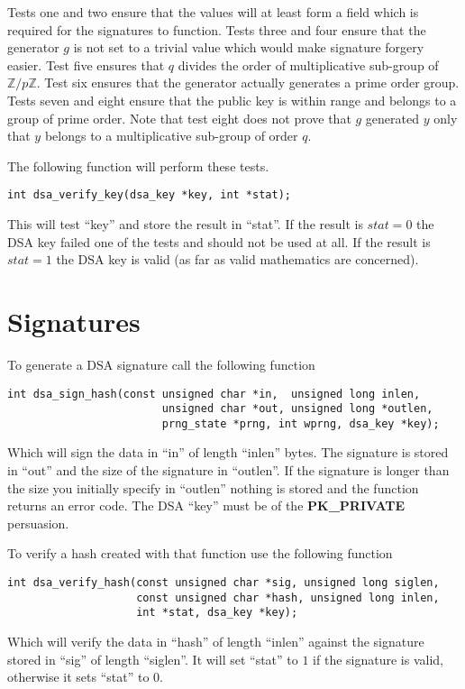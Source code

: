 \documentclass[b5paper]{book}
\def\Z{{\mathbb Z}}
\begin{document}
Tests one and two ensure that the values will at least form a field which is required for the signatures to  
function.  Tests three and four ensure that the generator $g$ is not set to a trivial value which would make signature
forgery easier.  Test five ensures that $q$ divides the order of multiplicative sub-group of $\Z/p\Z$. Test six
ensures that the generator actually generates a prime order group.  Tests seven and eight ensure that the public key
is within range and belongs to a group of prime order.  Note that test eight does not prove that $g$ generated $y$ only
that $y$ belongs to a multiplicative sub-group of order $q$. 

The following function will perform these tests.

\begin{verbatim}
int dsa_verify_key(dsa_key *key, int *stat);
\end{verbatim}

This will test ``key'' and store the result in ``stat''.  If the result is $stat = 0$ the DSA key failed one of the tests
and should not be used at all.  If the result is $stat = 1$ the DSA key is valid (as far as valid mathematics are concerned).



\section{Signatures}
To generate a DSA signature call the following function

\begin{verbatim}
int dsa_sign_hash(const unsigned char *in,  unsigned long inlen,
                        unsigned char *out, unsigned long *outlen,
                        prng_state *prng, int wprng, dsa_key *key);
\end{verbatim}

Which will sign the data in ``in'' of length ``inlen'' bytes.  The signature is stored in ``out'' and the size
of the signature in ``outlen''.  If the signature is longer than the size you initially specify in ``outlen'' nothing
is stored and the function returns an error code.  The DSA ``key'' must be of the \textbf{PK\_PRIVATE} persuasion.

To verify a hash created with that function use the following function

\begin{verbatim}
int dsa_verify_hash(const unsigned char *sig, unsigned long siglen,
                    const unsigned char *hash, unsigned long inlen, 
                    int *stat, dsa_key *key);
\end{verbatim}
Which will verify the data in ``hash'' of length ``inlen'' against the signature stored in ``sig'' of length ``siglen''.  
It will set ``stat'' to $1$ if the signature is valid, otherwise it sets ``stat'' to $0$.  
\end{document}
